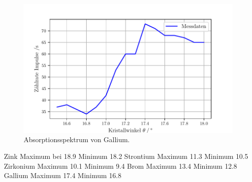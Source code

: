 \begin{figure}[H]
  \centering
  \includegraphics[width=\textwidth]{build/plot7.pdf}
  \caption{Absorptionsspektrum von Gallium.}
  \label{fig:plot7}
\end{figure}

Zink Maximum bei 18.9 Minimum 18.2
Strontium Maximum 11.3 Minimum 10.5
Zirkonium Maximum 10.1 Minimum 9.4
Brom Maximum 13.4 Minimum 12.8
Gallium Maximum 17.4 Minimum 16.8
